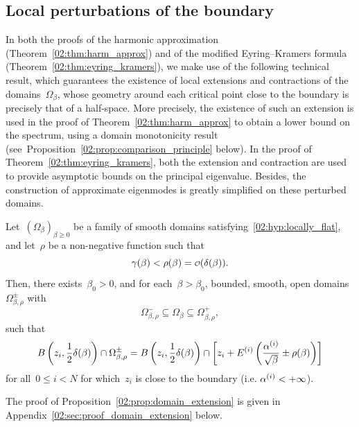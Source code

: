     \subsection{Local perturbations of the boundary}
    \label{02:subsec:domain_extension}
    In both the proofs of the harmonic approximation (Theorem~\ref{02:thm:harm_approx}) and of the modified Eyring--Kramers formula (Theorem~\ref{02:thm:eyring_kramers}), we make use of the following technical result, which guarantees the existence of local extensions and contractions of the domains~$\Omega_\beta$, whose geometry around each critical point close to the boundary is precisely that of a half-space.
    More precisely, the existence of such an extension is used in the proof of Theorem~\ref{02:thm:harm_approx} to obtain a lower bound on the spectrum, using a domain monotonicity result (see~Proposition~\ref{02:prop:comparison_principle} below).
    In the proof of Theorem~\ref{02:thm:eyring_kramers}, both the extension and contraction are used to provide asymptotic bounds on the principal eigenvalue.
    Besides, the construction of approximate eigenmodes is greatly simplified on these perturbed domains.
    \begin{proposition}
        \label{02:prop:domain_extension}
        Let~$(\Omega_\beta)_{\beta\geq 0}$ be a family of smooth domains satisfying~\eqref{02:hyp:locally_flat}, and let~$\rho$ be a non-negative function such that
        \begin{equation}
            \label{02:eq:shift_scaling}
            \smallRadius(\beta)<\rho(\beta) = \smallo(\largeRadius(\beta)).
        \end{equation}
        Then, there exists~$\beta_0>0$, and for each~$\beta>\beta_0$, bounded, smooth, open domains~$\Omega_{\beta,\rho}^\pm$ with
        $${\Omega_{\beta,\rho}^-\subseteq \Omega_\beta\subseteq\Omega_{\beta,\rho}^+},$$ such that
        \begin{equation}
            \label{02:eq:inclusion_perturbed_domain}
           B\left(z_i,\frac12\delta(\beta)\right) \cap \Omega_{\beta,\rho}^\pm = B\left(z_i,\frac12\delta(\beta)\right) \cap \left[z_i + E^{(i)}\left(\frac{\alpha^{(i)}}{\sqrt\beta}\pm \rho(\beta)\right)\right]
        \end{equation}
        for all~$0\leq i < N$ for which~$z_i$ is close to the boundary (i.e. $\alpha^{(i)}<+\infty$).
    \end{proposition}
    The proof of Proposition~\ref{02:prop:domain_extension} is given in Appendix~\ref{02:sec:proof_domain_extension} below.

